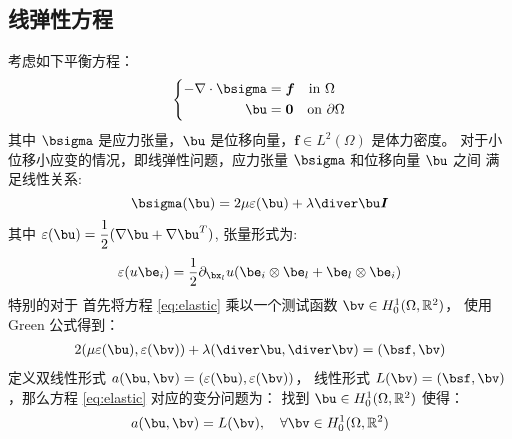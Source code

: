 \subsection{线弹性方程}
考虑如下平衡方程：
\begin{equation}
    \label{eq:elastic}
    \left\{
    \begin{aligned}
        -\nabla \cdot \bsigma & = \boldsymbol{f} \quad \text{in} \ \Omega\\
        \bu & = \boldsymbol{0} \quad \text{on} \ \partial \Omega
    \end{aligned}
\right.
\end{equation}
其中 $\bsigma$ 是应力张量，$\bu$ 是位移向量，$\boldsymbol{f} \in L^2(\Omega)$ 是体力密度。
对于小位移小应变的情况，即线弹性问题，应力张量 $\bsigma$ 和位移向量 $\bu$ 之间
满足线性关系:
$$
\bsigma(\bu) = 2\mu\varepsilon(\bu) + \lambda \diver \bu \boldsymbol{I}
$$
其中 $\varepsilon(\bu) = \dfrac{1}{2}(\nabla \bu + \nabla \bu^T)$, 张量形式为:
$$
\varepsilon(u\be_i) = \frac{1}{2}
\partial_{\bx_l}u
(\be_i\otimes \be_l + \be_l\otimes \be_i)
$$
特别的对于  
首先将方程 \eqref{eq:elastic} 乘以一个测试函数 $\bv \in H_0^1(\Omega,
\mathbb{R}^2)$，
使用 Green 公式得到：
$$
\begin{aligned}
    2(\mu\varepsilon(\bu), \varepsilon(\bv)) +  \lambda(\diver \bu, \diver \bv)
    & = (\bsf, \bv)\\
\end{aligned}
$$
定义双线性形式 $a(\bu, \bv) = (\varepsilon(\bu), \varepsilon(\bv))$，
线性形式 $L(\bv) = (\bsf, \bv)$，那么方程 \eqref{eq:elastic} 对应的变分问题为：
找到 $\bu \in H_0^1(\Omega, \mathbb{R}^2)$ 使得：
$$
a(\bu, \bv) = L(\bv), \quad \forall \bv \in H_0^1(\Omega, \mathbb{R}^2)
$$
